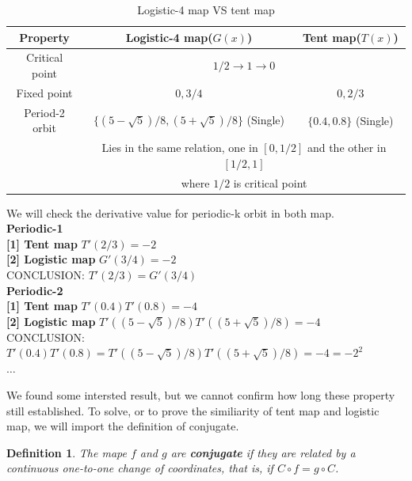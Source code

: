 \documentclass[12pt]{article}
\theoremstyle{plain}
\newtheorem{definition}{\textbf{Definition}}[section]
\begin{document}
\begin{table}[H]
\centering  
\caption{Logistic-4 map VS tent map}  
\begin{tabular}{|c||c|c|}
\hline
Property             & Logistic-4 map($G(x)$)  & Tent map($T(x)$) \\
\hline
\hline
Critical point       & \multicolumn{2}{c|}{$1/2 \rightarrow 1 \rightarrow 0$}\\
\hline
Fixed point          & $0, 3/4$ & $0, 2/3$ \\
\hline
Period-2 orbit       & $\{(5-\sqrt5)/8, (5+\sqrt5)/8\}$ (Single) & $\{0.4, 0.8\}$ (Single) \\
                     & \multicolumn{2}{c|}{Lies in the same relation, one in $[0, 1/2]$ and the other in $[1/2, 1]$} \\
                     & \multicolumn{2}{c|}{where $1/2$ is critical point} \\
\hline
\end{tabular}  
\end{table}  

We will check the derivative value for periodic-k orbit in both map.
\\\noindent \textbf{Periodic-1}
\\\noindent \textbf{[1] Tent map} $T'(2/3) = -2$
\\\noindent \textbf{[2] Logistic map} $G'(3/4) = -2$
\\\noindent CONCLUSION: $T'(2/3) = G'(3/4)$
\\\noindent \textbf{Periodic-2}
\\\noindent \textbf{[1] Tent map} $T'(0.4)T'(0.8) = -4$
\\\noindent \textbf{[2] Logistic map} $T'((5-\sqrt5)/8)T'((5+\sqrt5)/8) = -4$
\\\noindent CONCLUSION: $T'(0.4)T'(0.8) = T'((5-\sqrt5)/8)T'((5+\sqrt5)/8) = -4 = -2^2$
\\\noindent $\ldots$

We found some intersted result, but we cannot confirm how long these property still established. To solve, or to prove the similiarity of tent map and logistic map, we will import the definition of conjugate.

\begin{definition}The mape $f$ and $g$ are \textbf{conjugate} if they are related by a continuous one-to-one change of coordinates, that is, if $C \circ f = g \circ C$.
\end{definition}
\end{document}
